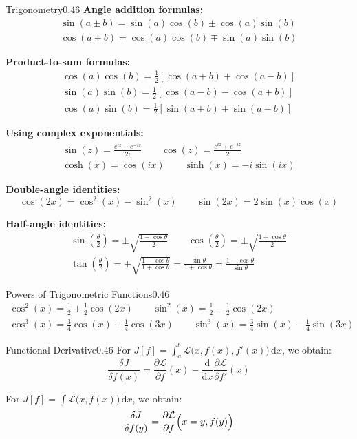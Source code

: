 \begin{mytikzbox}{Trigonometry}{0.46}
\textbf{Angle addition formulas:}
\begin{gather*}
\sin(a\pm b)=\sin(a)\cos(b)\pm\cos(a)\sin(b) \\
\cos(a\pm b)=\cos(a)\cos(b)\mp\sin(a)\sin(b)
\end{gather*}

\textbf{Product-to-sum formulas:}
\begin{gather*}
\cos(a)\cos(b)=\frac{1}{2}\left[\cos(a+b)+\cos(a-b)\right] \\
\sin(a)\sin(b)=\frac{1}{2}\left[\cos(a-b)-\cos(a+b)\right] \\
\cos(a)\sin(b)=\frac{1}{2}\left[\sin(a+b)+\sin(a-b)\right]
\end{gather*}

\textbf{Using complex exponentials:}
\begin{gather*}
\sin(z)=\frac{e^{iz}-e^{-iz}}{2i}
\qquad
\cos(z)=\frac{e^{iz}+e^{-iz}}{2} \\
\cosh(x)=\cos(ix)
\qquad
\sinh(x)=-i\sin(ix)
\end{gather*}

\textbf{Double-angle identities:}
\[
\cos(2x)=\cos^2(x)-\sin^2(x)
\qquad
\sin(2x)=2\sin(x)\cos(x)
\]

\textbf{Half-angle identities:}
\begin{gather*}
\sin\left(\frac{\theta}{2}\right)
=\pm\sqrt{\frac{1-\cos\theta}{2}}
\qquad
\cos\left(\frac{\theta}{2}\right)
=\pm\sqrt{\frac{1+\cos\theta}{2}} \\
\tan\left(\frac{\theta}{2}\right)
=\pm\sqrt{\frac{1-\cos\theta}{1+\cos\theta}}
=\frac{\sin\theta}{1+\cos\theta}
=\frac{1-\cos\theta}{\sin\theta}
\end{gather*}
\end{mytikzbox}

\begin{mytikzbox}{Powers of Trigonometric Functions}{0.46}
\begin{gather*}
\cos^2(x)=\frac{1}{2}+\frac{1}{2}\cos(2x)
\qquad
\sin^2(x)=\frac{1}{2}-\frac{1}{2}\cos(2x)
\\
\cos^3(x)=\frac{3}{4}\cos(x)+\frac{1}{4}\cos(3x)
\qquad
\sin^3(x)=\frac{3}{4}\sin(x)-\frac{1}{4}\sin(3x)
\end{gather*}
\end{mytikzbox}

\begin{mytikzbox}{Functional Derivative}{0.46}
For
$J[f]=\int_{a}^{b}\mathcal{L}\bigl(x,f(x),f'(x)\bigr)\,\mathrm{d}x$,
we obtain:
\[
\frac{\delta J}{\delta f(x)}
=
\frac{\partial\mathcal{L}}{\partial f}(x)
-
\frac{\mathrm{d}}{\mathrm{d}x}
\frac{\partial\mathcal{L}}{\partial f'}(x)
\]

For
$J[f]=\int\mathcal{L}\bigl(x,f(x)\bigr)\,\mathrm{d}x$,
we obtain:
\[
\frac{\delta J}{\delta f(y)}
=
\frac{\partial\mathcal{L}}{\partial f}
\Bigl(x=y,f(y)\Bigr)
\]
\end{mytikzbox}

